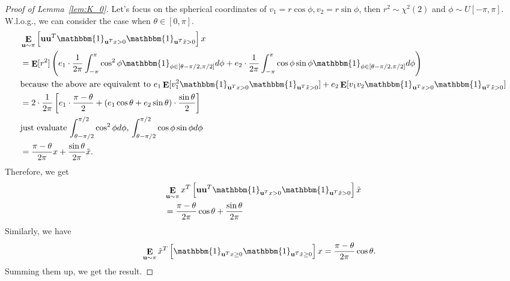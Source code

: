 \documentclass[11pt]{article}
\numberwithin{equation}{section}
\def\E{\mathop{\mathbf{E}}}
\def\bd#1{\mathbf{#1}}
\begin{document}
\begin{proof}[Proof of Lemma~\ref{lem:K_0}]
	Let's focus on the spherical coordinates of $v_1 = r\cos\phi, v_2=r\sin\phi$, then $r^2 \sim \chi^2(2)$ and $\phi \sim U[-\pi, \pi]$. W.l.o.g., we can consider the case when $\theta \in [0, \pi]$.
	\begin{align*}
		&\E_{\bd{u} \sim \pi} \left[ \bd{u} \bd{u}^T \mathbbm{1}_{\bd{u}^T x >0} \mathbbm{1}_{\bd{u}^T \tilde x >0} \right] x\\
		&= \E[r^2] \left(e_1 \cdot  \frac{1}{2\pi}\int_{-\pi}^{\pi} \cos^2\phi \mathbbm{1}_{\phi \in [\theta-\pi/2, \pi/2]} d\phi + e_2 \cdot \frac{1}{2\pi}\int_{-\pi}^{\pi} \cos\phi \sin\phi \mathbbm{1}_{\phi \in [\theta-\pi/2, \pi/2]} d\phi  \right) \\
		& \text{because the above are equivalent to $e_1 \E[v_1^2 \mathbbm{1}_{\bd{u}^T x >0} \mathbbm{1}_{\bd{u}^T \tilde x >0}] + e_2 \E[v_1 v_2 \mathbbm{1}_{\bd{u}^T x >0} \mathbbm{1}_{\bd{u}^T \tilde x >0}]$} \\
		&= 2 \cdot \frac{1}{2\pi} \left[ e_1 \cdot \frac{\pi-\theta}{2} + ( e_1 \cos\theta + e_2\sin\theta) \cdot \frac{\sin\theta}{2}  \right] \\
		& \text{just evaluate $\int_{\theta-\pi/2}^{\pi/2} \cos^2 \phi d\phi$, $\int_{\theta-\pi/2}^{\pi/2} \cos \phi \sin \phi d\phi$} \\
		&= \frac{\pi-\theta}{2\pi} x + \frac{\sin\theta}{2\pi} \tilde x.
	\end{align*}
	Therefore, we get
	\begin{align*}
		&\E_{\bd{u} \sim \pi} x^T \left[ \bd{u} \bd{u}^T \mathbbm{1}_{\bd{u}^T x >0} \mathbbm{1}_{\bd{u}^T \tilde x >0} \right] \tilde x\\
		&= \frac{\pi-\theta}{2\pi} \cos\theta + \frac{\sin\theta}{2\pi}
	\end{align*}
	Similarly, we have
	\begin{align}
		&\E_{\bd{u} \sim\pi} \tilde x^T\left[ \mathbbm{1}_{\bd{u}^Tx\geq0}\mathbbm{1}_{\bd{u}^T\tilde x\geq 0 }\right]x = \frac{\pi-\theta}{2\pi}\cos\theta. 
	\end{align}
	Summing them up, we get the result.
\end{proof}
\end{document}
